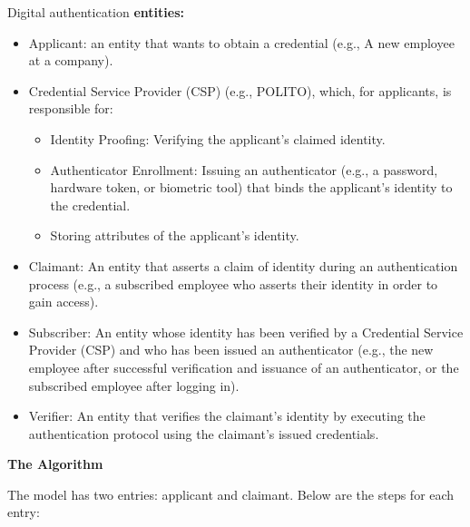 \noindent Digital authentication \textbf{entities:} 
\begin{itemize}
    \item Applicant: an entity that wants to obtain a credential (e.g., A new employee at a company).
    \item Credential Service Provider (CSP) (e.g., POLITO), which, for applicants, is responsible for:
    \begin{itemize}
        \item Identity Proofing: Verifying the applicant’s claimed identity.
        \item Authenticator Enrollment: Issuing an authenticator (e.g., a password, hardware token, or biometric tool) that binds the applicant’s identity to the credential.
        \item Storing attributes of the applicant’s identity.
    \end{itemize}
    \item Claimant: An entity that asserts a claim of identity during an authentication process (e.g., a subscribed employee who asserts their identity in order to gain access).
    \item Subscriber: An entity whose identity has been verified by a Credential Service Provider (CSP) and who has been issued an authenticator (e.g., the new employee after successful verification and issuance of an authenticator, or the subscribed employee after logging in).
    \item Verifier: An entity that verifies the claimant’s identity by executing the authentication protocol using the claimant’s issued credentials.
\end{itemize}

\hfill

\begin{center}
    \textbf{The Algorithm}
\end{center}

The model has two entries: applicant and claimant. Below are the steps for each entry:

